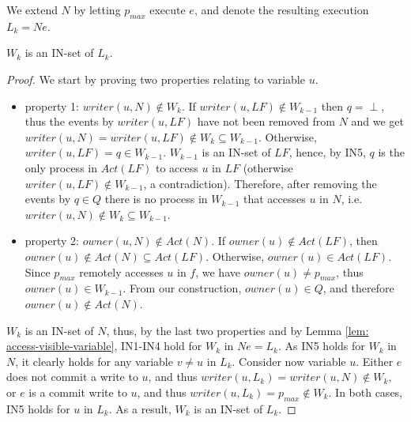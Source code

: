 We extend $N$ by letting $p_{max}$ execute $e$, and denote the resulting execution $L_k = N e$.

\begin{claim-subsection} \label{claim: W_k-is-an-IN-set}
	$W_k$ is an IN-set of $L_k$.
\end{claim-subsection}

\begin{proof}

We start by proving two properties relating to variable $u$.

\begin{itemize}

\item property 1: $writer(u,N) \notin W_k$. If $writer(u, L F) \notin W_{k-1}$ then $q = \perp$, thus the events by $writer(u, L F)$ have not been removed from $N$ and we get $writer(u, N) = writer(u, L F) \notin W_k \subseteq W_{k-1}$. Otherwise, $writer(u, L F) = q \in W_{k-1}$. $W_{k-1}$ is an IN-set of $L F$, hence, by IN5, $q$ is the only process in $Act(L F)$ to access $u$ in $L F$ (otherwise $writer(u, L F) \notin W_{k-1}$, a contradiction). Therefore, after removing the events by $q \in Q$ there is no process in $W_{k-1}$ that accesses $u$ in $N$, i.e. $writer(u, N) \notin W_k \subseteq W_{k-1}$.
    
\item property 2: $owner(u,N) \notin Act(N)$. If $owner(u) \notin Act(L F)$, then $owner(u) \notin Act(N) \subseteq Act(L F)$. Otherwise, $owner(u) \in Act(L F)$. Since $p_{max}$ remotely accesses $u$ in $f$, we have $owner(u) \neq p_{max}$, thus  $owner(u) \in W_{k-1}$. From our construction, $owner(u) \in Q$, and therefore $owner(u) \notin Act(N)$.
    
\end{itemize}
	
	$W_k$ is an IN-set of $N$, thus, by the last two properties and by Lemma \ref{lem: access-visible-variable}, IN1-IN4 hold for $W_k$ in $N e = L_k$. As IN5 holds for $W_k$ in $N$, it clearly holds for any variable $v \neq u$ in $L_k$. Consider now variable $u$. Either $e$ does not commit a write to $u$, and thus $writer(u,L_k) = writer(u,N) \notin W_k$, or $e$ is a commit write to $u$, and thus $writer(u,L_k) = p_{max} \notin W_k$. In both cases, IN5 holds for $u$ in $L_k$. As a result, $W_k$ is an IN-set of $L_k$.
\end{proof}

